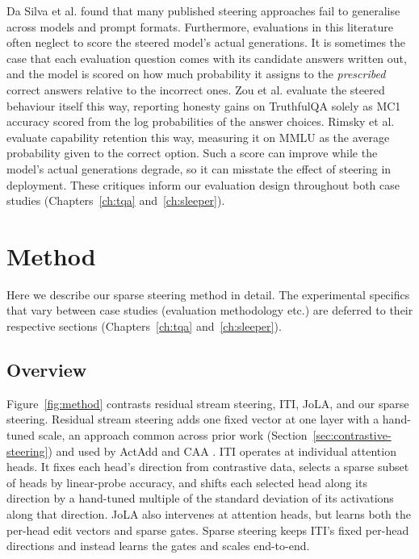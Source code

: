 \documentclass[logo,msc,notimes]{infthesis}
\begin{document}
Da Silva et al. \citep{dasilva2025steering} found that many published steering approaches
fail to generalise across models and prompt formats. Furthermore, evaluations in this literature
often neglect to score the steered model's actual generations. It is sometimes the case that each evaluation question comes with its candidate answers written out,
and the model is scored on how much probability it assigns to the \emph{prescribed} correct answers
relative to the incorrect ones. Zou et
al. \citep{zou2023repe} evaluate the steered behaviour itself this way, reporting honesty gains on
TruthfulQA solely as MC1 accuracy scored from the log probabilities of the answer choices. Rimsky et
al. \citep{rimsky2024caa} evaluate capability retention this way, measuring it on MMLU as the
average probability given to the correct option. Such a score can
improve while the model's actual generations degrade, so it can misstate the effect of steering in
deployment. These critiques inform our evaluation design
throughout both case studies (Chapters~\ref{ch:tqa} and~\ref{ch:sleeper}).

\chapter{Method}\label{ch:method}

Here we describe our sparse steering method in detail. The experimental specifics that vary between case studies (evaluation methodology etc.) are deferred to their respective sections (Chapters~\ref{ch:tqa} and~\ref{ch:sleeper}).

\section{Overview}

Figure~\ref{fig:method} contrasts residual stream steering, ITI, JoLA, and our sparse steering. Residual stream
steering adds one fixed vector at one layer with a hand-tuned scale, an approach common across prior
work (Section~\ref{sec:contrastive-steering}) and used by ActAdd \citep{turner2025actadd} and CAA
\citep{rimsky2024caa}. ITI operates at individual
attention heads. It fixes each head's direction from contrastive data, selects a sparse subset of
heads by linear-probe accuracy, and shifts each selected head along its direction by a hand-tuned
multiple of the standard deviation of its activations along that direction. JoLA also intervenes at attention
heads, but learns both the per-head edit vectors and sparse gates. Sparse steering keeps ITI's fixed
per-head directions and instead learns the gates and scales end-to-end.
\end{document}
